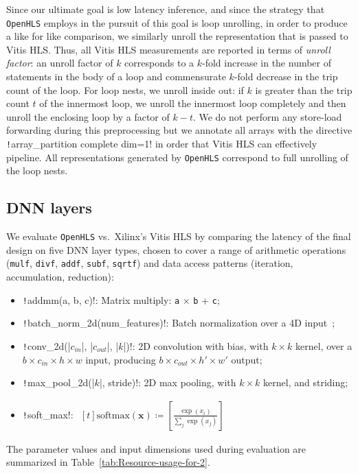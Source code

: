 \documentclass[10pt]{sig-alternate}
\begin{document}
Since our ultimate goal is low latency inference, and since the strategy
that \texttt{OpenHLS} employs in the pursuit of this goal is loop
unrolling, in order to produce a like for like comparison, we similarly
unroll the representation that is passed to Vitis HLS. Thus, all Vitis
HLS measurements are reported in terms of \emph{unroll factor}: an
unroll factor of $k$ corresponds to a $k$-fold increase in the number
of statements in the body of a loop and commensurate $k$-fold decrease
in the trip count of the loop. For loop nests, we unroll inside out:
if $k$ is greater than the trip count $t$ of the innermost loop,
we unroll the innermost loop completely and then unroll the enclosing
loop by a factor of $k-t$. We do not perform any store-load forwarding
during this preprocessing but we annotate all arrays with the directive
\texttt!array_partition complete dim=1! in order that Vitis
HLS can effectively pipeline. All representations generated by \texttt{OpenHLS}
correspond to full unrolling of the loop nests.

\subsection{DNN layers}

We evaluate \texttt{OpenHLS}
vs.\ Xilinx's Vitis HLS by comparing the latency of the final design
on five DNN layer types, chosen to cover a range of arithmetic operations (\texttt{mulf},
\texttt{divf}, \texttt{addf}, \texttt{subf}, \texttt{sqrtf}) and data
access patterns (iteration, accumulation, reduction):
\begin{itemize}
\item \texttt!addmm(a, b, c)!: Matrix multiply:
\texttt{a} $\times$ \texttt{b} + \texttt{c};
\item \texttt!batch_norm_2d(num_features)!: Batch normalization
over a 4D input~\cite{https://doi.org/10.48550/arxiv.1502.03167};
\item \texttt!conv_2d(|$c_{in}$|, |$c_{out}$|, |$k$|)!: 2D
convolution with bias, with $k\times k$ kernel, over a $b\times c_{in}\times h\times w$
input, producing $b\times c_{out}\times h'\times w'$ output;
\item \texttt!max_pool_2d(|$k$|, stride)!: 2D max pooling,
with $k\times k$ kernel, and striding;
\item \texttt!soft_max!:
$\begin{aligned}[t]
\text{softmax}\left(\boldsymbol{x}\right)\coloneqq\left[\frac{\exp\left(x_{i}\right)}{\sum_{j}\exp\left(x_{j}\right)}\right]
\end{aligned}$
\end{itemize}
The parameter values and input dimensions used during evaluation are
summarized in Table~\ref{tab:Resource-usage-for-2}.
\end{document}
